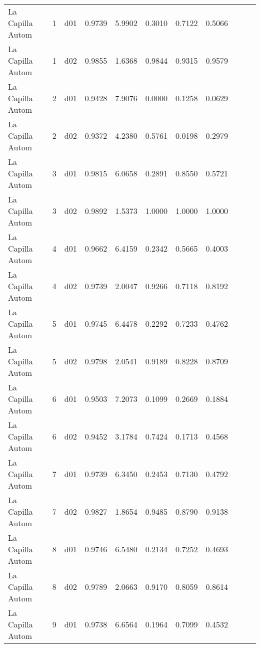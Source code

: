 \begin{landscape}
\begin{longtable}{p{2cm}rrrrrrrrrr}
     La Capilla Autom  &          1 &     d01 &   0.9739 &  5.9902 &        0.3010 &           0.7122 &  0.5066 \\
     La Capilla Autom  &          1 &     d02 &   0.9855 &  1.6368 &        0.9844 &           0.9315 &  0.9579 \\
     La Capilla Autom  &          2 &     d01 &   0.9428 &  7.9076 &        0.0000 &           0.1258 &  0.0629 \\
     La Capilla Autom  &          2 &     d02 &   0.9372 &  4.2380 &        0.5761 &           0.0198 &  0.2979 \\
     La Capilla Autom  &          3 &     d01 &   0.9815 &  6.0658 &        0.2891 &           0.8550 &  0.5721 \\
     La Capilla Autom  &          3 &     d02 &   0.9892 &  1.5373 &        1.0000 &           1.0000 &  1.0000 \\
     La Capilla Autom  &          4 &     d01 &   0.9662 &  6.4159 &        0.2342 &           0.5665 &  0.4003 \\
     La Capilla Autom  &          4 &     d02 &   0.9739 &  2.0047 &        0.9266 &           0.7118 &  0.8192 \\
     La Capilla Autom  &          5 &     d01 &   0.9745 &  6.4478 &        0.2292 &           0.7233 &  0.4762 \\
     La Capilla Autom  &          5 &     d02 &   0.9798 &  2.0541 &        0.9189 &           0.8228 &  0.8709 \\
     La Capilla Autom  &          6 &     d01 &   0.9503 &  7.2073 &        0.1099 &           0.2669 &  0.1884 \\
     La Capilla Autom  &          6 &     d02 &   0.9452 &  3.1784 &        0.7424 &           0.1713 &  0.4568 \\
     La Capilla Autom  &          7 &     d01 &   0.9739 &  6.3450 &        0.2453 &           0.7130 &  0.4792 \\
     La Capilla Autom  &          7 &     d02 &   0.9827 &  1.8654 &        0.9485 &           0.8790 &  0.9138 \\
     La Capilla Autom  &          8 &     d01 &   0.9746 &  6.5480 &        0.2134 &           0.7252 &  0.4693 \\
     La Capilla Autom  &          8 &     d02 &   0.9789 &  2.0663 &        0.9170 &           0.8059 &  0.8614 \\
     La Capilla Autom  &          9 &     d01 &   0.9738 &  6.6564 &        0.1964 &           0.7099 &  0.4532 \\

\end{longtable}
\end{landscape}
